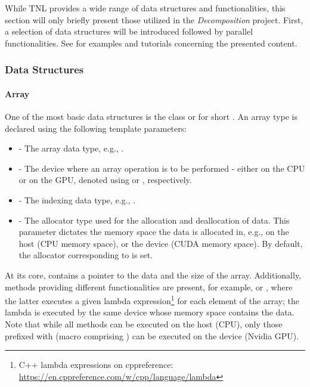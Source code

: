 While TNL provides a wide range of data structures and functionalities, this section will only briefly present those utilized in the \textit{Decomposition} project. First, a selection of data structures will be introduced followed by parallel functionalities. See  \cite{ixA8ZYptYohwlgwt} for examples and tutorials concerning the presented content.

\subsubsection{Data Structures}

\paragraph{Array} One of the most basic data structures is the  class or  for short \cite{ixA8ZYptYohwlgwt}. An array type is declared using the following template parameters:

\begin{itemize}
	\item {} - The array data type, e.g., .
	\item {} - The device where an array operation is to be performed - either on the CPU or on the GPU, denoted using  or , respectively.
	\item {} - The indexing data type, e.g., .
	\item {} - The allocator type used for the allocation and deallocation of data. This parameter dictates the memory space the data is allocated in, e.g., on the host (CPU memory space), or the device (CUDA memory space). By default, the allocator corresponding to  is set.
\end{itemize}

At its core,  contains a pointer to the data and the size of the array. Additionally, methods providing different functionalities are present, for example,  or , where the latter executes a given lambda expression\footnote{C++ lambda expressions on cppreference: \url{https://en.cppreference.com/w/cpp/language/lambda}} for each element of the array; the lambda is executed by the same device whose memory space contains the data. Note that while all methods can be executed on the host (CPU), only those prefixed with  (macro comprising ) can be executed on the device (Nvidia GPU).

